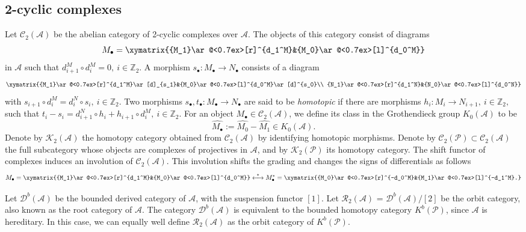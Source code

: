 \documentclass[reqno,12pt]{amsart}
\numberwithin{equation}{section}
\theoremstyle{plain} %
\theoremstyle{definition} %
\begin{document}
\subsection{2-cyclic complexes}
Let $\mathcal{C}_2(\mathcal{A})$ be the abelian category of 2-cyclic complexes over $\mathcal{A}$. The objects of this category consist of diagrams
\begin{equation*}M_\bullet=\xymatrix{{M_1}\ar@<0.7ex>[r]^{d_1^M}&{M_0}\ar@<0.7ex>[l]^{d_0^M}}\end{equation*}
in $\mathcal{A}$ such that $d_{i+1}^M\circ d_{i}^M=0, ~i\in \mathbb{Z}_2$.
A morphism $s_\bullet: M_\bullet \rightarrow N_\bullet$ consists of a diagram
\begin{equation*}\xymatrix{{M_1}\ar@<0.7ex>[r]^{d_1^M}\ar[d]_{s_1}&{M_0}\ar@<0.7ex>[l]^{d_0^M}\ar[d]^{s_0}\\
{N_1}\ar@<0.7ex>[r]^{d_1^N}&{N_0}\ar@<0.7ex>[l]^{d_0^N}}\end{equation*}
with $s_{i+1}\circ d_i^M=d_i^N\circ s_i, ~i\in \mathbb{Z}_2$.
Two morphisms $s_\bullet, t_\bullet : M_\bullet \rightarrow N_\bullet$ are said to be \emph{homotopic} if there are morphisms $h_i : M_i \rightarrow N_{i+1},~i\in \mathbb{Z}_2,$ such that $t_i-s_i={d_{i+1}^N}\circ h_i+{h_{i+1}}\circ d_i^M,~i\in \mathbb{Z}_2$.
For an object $M_\bullet\in\mathcal{C}_2(\mathcal{A})$, we define its class in the Grothendieck group $K_0(\mathcal{A})$ to be
$$\hat{M_\bullet} := \hat{M_0}-\hat{M_1}\in K_0(\mathcal{A}).$$
Denote by ${\mathcal {K}}_2(\mathcal{A})$ the homotopy category obtained from $\mathcal{C}_2(\mathcal{A})$ by identifying homotopic morphisms. Denote by $\mathcal{C}_2(\mathscr{P}) \subset \mathcal{C}_2(\mathcal{A})$ the full subcategory whose objects are complexes of projectives in $\mathcal{A}$, and by ${\mathcal {K}}_2(\mathscr{P})$ its homotopy category.
The shift functor of complexes induces an involution of $\mathcal{C}_2(\mathcal{A})$. This involution
shifts the grading and changes the signs of differentials as follows
\[{M_ \bullet } = \xymatrix{{M_1}\ar@<0.7ex>[r]^{d_1^M}&{M_0}\ar@<0.7ex>[l]^{d_0^M}}\overset {*} \longleftrightarrow M_ \bullet ^* = \xymatrix{{M_0}\ar@<0.7ex>[r]^{-d_0^M}&{M_1}\ar@<0.7ex>[l]^{-d_1^M}.}\]

Let $\mathcal{D}^b(\mathcal{A})$ be the bounded derived category of $\mathcal{A}$, with the suspension functor $[1]$. Let $\mathcal{R}_2(\mathcal{A})$ = $\mathcal{D}^b(\mathcal{A})/[2]$ be the orbit category, also known as the root category of $\mathcal{A}$. The category $\mathcal{D}^b(\mathcal{A})$ is equivalent to the bounded homotopy category $K^b(\mathscr{P})$, since $\mathcal{A}$ is hereditary. In this case, we can equally well define  $\mathcal{R}_2(\mathcal{A})$ as the orbit category of $K^b(\mathscr{P})$.
\end{document}
